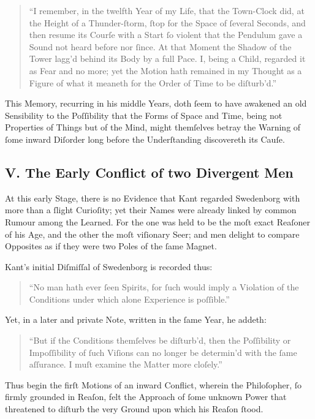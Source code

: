 \documentclass[12pt]{article}
\begin{document}
\begin{quote}
\small
“I remember, in the twelfth Year of my Life, that the Town-Clock did, at the 
Height of a Thunder-ſtorm, ſtop for the Space of ſeveral Seconds, and then 
resume its Courſe with a Start ſo violent that the Pendulum gave a Sound not 
heard before nor ſince. At that Moment the Shadow of the Tower lagg’d 
behind its Body by a full Pace. I, being a Child, regarded it as Fear and 
no more; yet the Motion hath remained in my Thought as a Figure of what it 
meaneth for the Order of Time to be diſturb’d.”
\end{quote}

This Memory, recurring in his middle Years, doth ſeem to have awakened an 
old Sensibility to the Poſſibility that the Forms of Space and Time, being not 
Properties of Things but of the Mind, might themſelves betray the Warning of 
ſome inward Diſorder long before the Underſtanding discovereth its Cauſe.

\subsection*{V. The Early Conflict of two Divergent Men}

At this early Stage, there is no Evidence that Kant regarded Swedenborg 
with more than a ſlight Curioſity; yet their Names were already linked by 
common Rumour among the Learned. For the one was held to be the moſt exact 
Reaſoner of his Age, and the other the moſt viſionary Seer; and men delight 
to compare Opposites as if they were two Poles of the ſame Magnet.

Kant’s initial Diſmiſſal of Swedenborg is recorded thus:

\begin{quote}
\small
“No man hath ever ſeen Spirits, for ſuch would imply a Violation of the 
Conditions under which alone Experience is poſſible.”
\end{quote}

Yet, in a later and private Note, written in the ſame Year, he addeth:

\begin{quote}
\small
“But if the Conditions themſelves be diſturb’d, then the Poſſibility or 
Impoſſibility of ſuch Viſions can no longer be determin’d with the ſame 
aſſurance. I muſt examine the Matter more cloſely.”
\end{quote}

Thus begin the firſt Motions of an inward Conflict, wherein the Philoſopher, 
ſo firmly grounded in Reaſon, felt the Approach of ſome unknown Power that 
threatened to diſturb the very Ground upon which his Reaſon ſtood.
\end{document}
